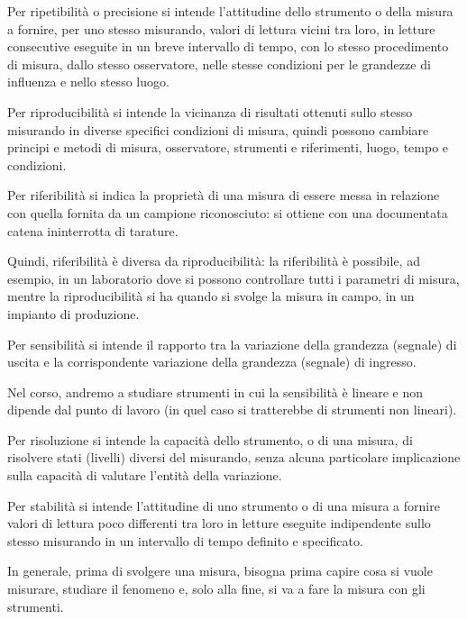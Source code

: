 Per ripetibilità o precisione si intende l'attitudine dello strumento o della misura a fornire, 
per uno stesso misurando, valori di lettura vicini tra loro, in letture consecutive eseguite in un breve intervallo di tempo, 
con lo stesso procedimento di misura, dallo stesso osservatore, nelle stesse condizioni per le grandezze di influenza e nello stesso luogo. \newline 

Per riproducibilità si intende la vicinanza di risultati ottenuti sullo stesso misurando in diverse specifici condizioni di misura, quindi possono cambiare principi e metodi di misura, osservatore, strumenti e riferimenti, luogo, tempo e condizioni.\newline

Per riferibilità si indica la proprietà di una misura di essere messa in relazione con quella fornita da un campione riconosciuto: si ottiene con una documentata catena ininterrotta di tarature. \newline 

Quindi, riferibilità è diversa da riproducibilità: la riferibilità è possibile, ad esempio, in un laboratorio dove si possono controllare tutti i parametri di misura, mentre la riproducibilità si ha quando si svolge la misura in campo, in un impianto di produzione. \newline 

Per sensibilità si intende il rapporto tra la variazione della grandezza (segnale) di uscita e la corrispondente variazione della grandezza (segnale) di ingresso. \newline 

Nel corso, andremo a studiare strumenti in cui la sensibilità è lineare e non dipende dal punto di lavoro (in quel caso si tratterebbe di strumenti non lineari). \newline 

Per risoluzione si intende la capacità dello strumento, o di una misura, di risolvere stati (livelli) diversi del misurando, senza alcuna particolare implicazione sulla capacità di valutare l'entità della variazione. \newline 

Per stabilità si intende l'attitudine di uno strumento o di una misura a fornire valori di lettura poco differenti tra loro in letture eseguite indipendente sullo stesso misurando in un intervallo di tempo definito e specificato. \newline 

In generale, prima di svolgere una misura, bisogna prima capire cosa si vuole misurare, studiare il fenomeno e, solo alla fine, si va a fare la misura con gli strumenti. \newline 

